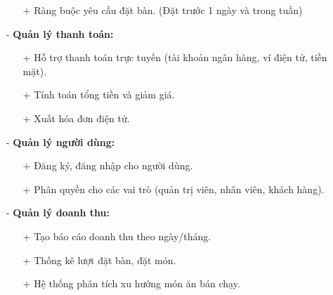 \documentclass[a4paper]{article}
\begin{document}
\begin{itemize}
\begin{itemize}
        \item[+] Ràng buộc yêu cầu đặt bàn. (Đặt trước 1 ngày và trong tuần)
    \end{itemize}
    \item[-] \textbf{Quản lý thanh toán:}
    \begin{itemize}
        \item[+] Hỗ trợ thanh toán trực tuyến (tài khoản ngân hàng, ví điện tử, tiền mặt).
        \item[+] Tính toán tổng tiền và giảm giá.
        \item[+] Xuất hóa đơn điện tử.
    \end{itemize}
    \item[-] \textbf{Quản lý người dùng:}
    \begin{itemize}
        \item[+] Đăng ký, đăng nhập cho người dùng.
        \item[+] Phân quyền cho các vai trò (quản trị viên, nhân viên, khách hàng).
    \end{itemize}
    \item[-] \textbf{Quản lý doanh thu:}
    \begin{itemize}
        \item[+] Tạo báo cáo doanh thu theo ngày/tháng.
        \item[+] Thống kê lượt đặt bàn, đặt món.
        \item[+] Hệ thống phân tích xu hướng món ăn bán chạy.
    \end{itemize}
\end{itemize}
\end{document}
